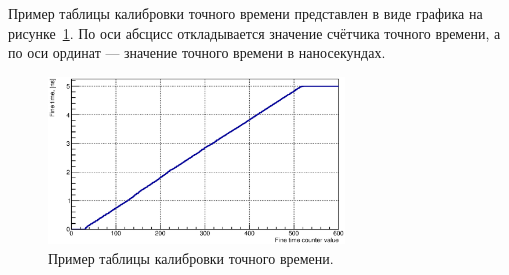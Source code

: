 Пример таблицы калибровки точного времени представлен в виде графика на рисунке~\ref{fig:CalibTable}. По оси абсцисс откладывается значение счётчика точного времени, а по оси ординат --- значение точного времени в наносекундах.

\begin{figure}[H]
\centering
\includegraphics[width=0.7\textwidth]{pictures/CalTable_0010_01.eps}
\caption{Пример таблицы калибровки точного времени.}
\label{fig:CalibTable}
\end{figure}
